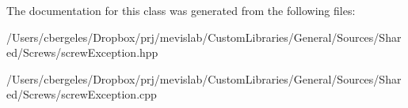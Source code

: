 The documentation for this class was generated from the following files\+:\begin{DoxyCompactItemize}
\item 
/\+Users/cbergeles/\+Dropbox/prj/mevislab/\+Custom\+Libraries/\+General/\+Sources/\+Shared/\+Screws/screw\+Exception.\+hpp\item 
/\+Users/cbergeles/\+Dropbox/prj/mevislab/\+Custom\+Libraries/\+General/\+Sources/\+Shared/\+Screws/screw\+Exception.\+cpp\end{DoxyCompactItemize}
